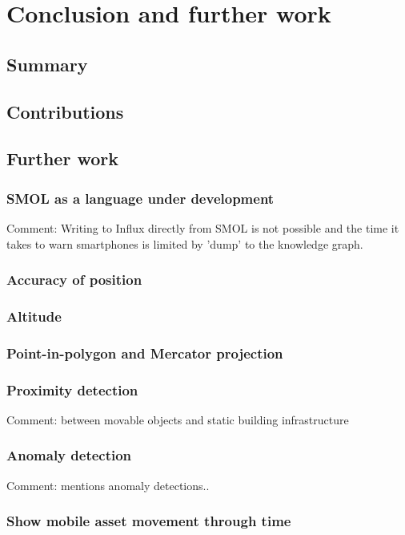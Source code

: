\documentclass{article}
\begin{document}
\newpage
\section{Conclusion and further work}\label{sec:Conclusion}
\subsection{Summary}
\subsection{Contributions}
\subsection{Further work}
\subsubsection{SMOL as a language under development}
Comment: Writing to Influx directly from SMOL is not possible and the time it takes to warn smartphones is limited by 'dump' to the knowledge graph.
\subsubsection{Accuracy of position}
\subsubsection{Altitude}
\subsubsection{Point-in-polygon and Mercator projection}
\subsubsection{Proximity detection}
Comment: between movable objects and static building infrastructure
\subsubsection{Anomaly detection}
Comment: \cite{li_digital_2022} mentions anomaly detections..
\subsubsection{Show mobile asset movement through time}




\newpage
\printbibliography
\end{document}
